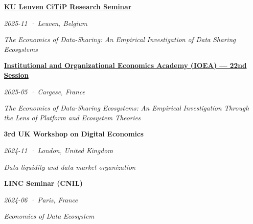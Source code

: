 \documentclass[11pt,a4paper]{article}
\newlength{\cvindent}
\newenvironment{cvblock}[1][1]{%
  \par\noindent\hspace*{#1\cvindent}%
  \begin{minipage}{\dimexpr\linewidth-#1\cvindent\relax}%
}{%
  \end{minipage}\par
}
\newenvironment{cvdetails}{%
  \begin{list}{}{%
    \setlength{\leftmargin}{\cvindent}%
    \setlength{\rightmargin}{0pt}%
    \setlength{\topsep}{0.1em}%
    \setlength{\partopsep}{0pt}%
    \setlength{\parsep}{0.05em}%
    \setlength{\itemsep}{0pt}%
  }\item[]\small\ignorespaces
}{%
  \end{list}
}
\begin{document}
\begin{cvblock}[2]
\textbf{\href{https://www.law.kuleuven.be/citip/en/news/item/archived_news/seminar-by-lucas-eustache-the-economics-of-data-sharing-an-empirical-investigation-of-data-sharing-ecosystems}{KU Leuven CiTiP Research Seminar}}\par
\begin{cvdetails}
{\small\itshape 2025-11 · Leuven, Belgium}\par
\textit{The Economics of Data-Sharing: An Empirical Investigation of Data Sharing Ecosystems}\par
\end{cvdetails}
\end{cvblock}\par\vspace{0.35em}

\begin{cvblock}[2]
\textbf{\href{https://www.ioea.eu/ioea2025/students.html}{Institutional and Organizational Economics Academy (IOEA) --- 22nd Session}}\par
\begin{cvdetails}
{\small\itshape 2025-05 · Cargese, France}\par
\textit{The Economics of Data-Sharing Ecosystems: An Empirical Investigation Through the Lens of Platform and Ecosystem Theories}\par
\end{cvdetails}
\end{cvblock}\par\vspace{0.35em}

\begin{cvblock}[2]
\textbf{3rd UK Workshop on Digital Economics}\par
\begin{cvdetails}
{\small\itshape 2024-11 · London, United Kingdom}\par
\textit{Data liquidity and data market organization}\par
\end{cvdetails}
\end{cvblock}\par\vspace{0.35em}

\begin{cvblock}[2]
\textbf{LINC Seminar (CNIL)}\par
\begin{cvdetails}
{\small\itshape 2024-06 · Paris, France}\par
\textit{Economics of Data Ecosystem}\par
\end{cvdetails}
\end{cvblock}\par\vspace{0.35em}
\end{document}
